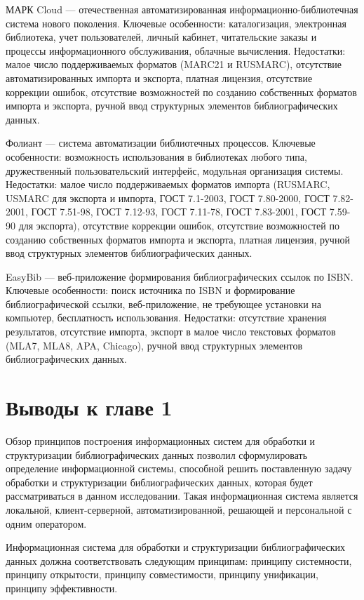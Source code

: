 МАРК Cloud — отечественная автоматизированная информационно-библиотечная система нового поколения.
Ключевые особенности: каталогизация, электронная библиотека, учет пользователей, личный кабинет, читательские заказы и процессы информационного обслуживания, облачные вычисления.
Недостатки: малое число поддерживаемых форматов (MARC21 и RUSMARC), отсутствие автоматизированных импорта и экспорта, платная лицензия, отсутствие коррекции ошибок, отсутствие возможностей по созданию собственных форматов импорта и экспорта, ручной ввод структурных элементов библиографических данных.

Фолиант — система автоматизации библиотечных процессов.
Ключевые особенности: возможность использования в библиотеках любого типа, дружественный пользовательский интерфейс, модульная организация системы.
Недостатки: малое число поддерживаемых форматов импорта (RUSMARC, USMARC для экспорта и импорта, ГОСТ 7.1-2003, ГОСТ 7.80-2000, ГОСТ 7.82-2001, ГОСТ 7.51-98, ГОСТ 7.12-93, ГОСТ 7.11-78, ГОСТ 7.83-2001, ГОСТ 7.59-90 для экспорта), отсутствие коррекции ошибок, отсутствие возможностей по созданию собственных форматов импорта и экспорта, платная лицензия, ручной ввод структурных элементов библиографических данных.

EasyBib — веб-приложение формирования библиографических ссылок по ISBN.
Ключевые особенности: поиск источника по ISBN и формирование библиографической ссылки, веб-приложение, не требующее установки на компьютер, бесплатность использования.
Недостатки: отсутствие хранения результатов, отсутствие импорта, экспорт в малое число текстовых форматов (MLA7, MLA8, APA, Chicago), ручной ввод структурных элементов библиографических данных.

\section*{Выводы к главе 1}

Обзор принципов построения информационных систем для обработки и структуризации библиографических данных позволил сформулировать определение информационной системы, способной решить поставленную задачу обработки и структуризации библиографических данных, которая будет рассматриваться в данном исследовании. Такая информационная система является локальной, клиент-серверной, автоматизированной, решающей и персональной с одним оператором.

Информационная система для обработки и структуризации библиографических данных должна соответствовать следующим принципам: принципу системности, принципу открытости, принципу совместимости, принципу унификации, принципу эффективности.

